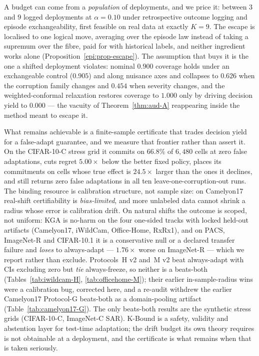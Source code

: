 \documentclass[conference]{IEEEtran}
\theoremstyle{plain}
\theoremstyle{definition}
\begin{document}
A budget can come from a \emph{population} of deployments, and we price it: between $3$ and $9$
logged deployments at $\alpha=0.10$ under retrospective outcome logging and episode
exchangeability, first feasible on real data at exactly $K=9$. The escape is localised to one
logical move, averaging over the episode law instead of taking a supremum over the fibre, paid for
with historical labels, and neither ingredient works alone
(Proposition~\ref{epi:prop-escape}). The assumption that buys it is the one a shifted deployment
violates: nominal $0.900$ coverage holds under an exchangeable control ($0.905$) and along nuisance
axes and collapses to $0.626$ when the corruption family changes and $0.454$ when severity changes,
and the weighted-conformal relaxation restores coverage to $1.000$ only by driving decision yield to
$0.000$ --- the vacuity of Theorem~\ref{thm:aud-A} reappearing inside the method meant to escape it.

What remains achievable is a finite-sample certificate that trades decision yield for a false-adapt
guarantee, and we measure that frontier rather than assert it. On the CIFAR-10-C stress grid it
commits on $66.8\%$ of $6{,}480$ cells at zero false adaptations, cuts regret $5.00\times$ below the
better fixed policy, places its commitments on cells whose true effect is $24.5\times$ larger than
the ones it declines, and still returns zero false adaptations in all ten leave-one-corruption-out
runs. The binding resource is calibration structure, not sample size: on Camelyon17 real-shift
certifiability is \emph{bias-limited}, and more unlabeled data cannot shrink a radius whose error is
calibration drift. On natural shifts the outcome is scoped, not uniform: \textsc{KGA} is no-harm on
the four one-sided tracks with locked held-out artifacts (Camelyon17, iWildCam, Office-Home,
RxRx1), and on PACS, ImageNet-R and CIFAR-10.1 it is a conservative null or a declared transfer
failure and \emph{loses} to always-adapt --- $1.76\times$ worse on ImageNet-R --- which we report
rather than exclude. Protocols~H v2 and~M v2 beat always-adapt with CIs excluding zero but
\emph{tie} always-freeze, so neither is a beats-both (Tables~\ref{tab:iwildcam-H},
\ref{tab:officehome-M}); their earlier in-sample-radius wins were a calibration bug, corrected here,
and a re-audit withdrew the earlier Camelyon17 Protocol-G beats-both as a domain-pooling artifact
(Table~\ref{tab:camelyon17-G}). The only beats-both results are the synthetic stress grids
(CIFAR-10-C, ImageNet-C SAR). K-Bound is a safety, validity and abstention layer for test-time
adaptation; the drift budget its own theory requires is not obtainable at a deployment, and the
certificate is what remains when that is taken seriously.
\end{document}
